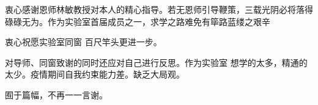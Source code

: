 \begin{acknowledgement}
    衷心感谢恩师林敏教授对本人的精心指导。若无恩师引导鞭策，三载光阴必将落得碌碌无为。作为实验室首届成员之一，求学之路难免有筚路蓝缕之艰辛

    衷心祝愿实验室同窗 百尺竿头更进一步。

    对导师、同窗致谢的同时还应对自己进行反思。作为实验室 想学的太多，精通的太少。疫情期间自我约束能力差。缺乏大局观。

    囿于篇幅，不再一一言谢。
\end{acknowledgement}
